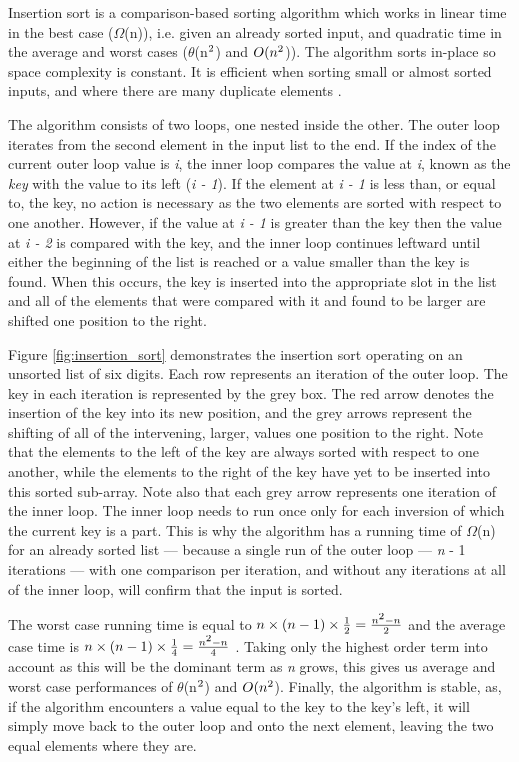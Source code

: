 \documentclass[12pt, a4paper]{article}
\begin{document}
Insertion sort is a comparison-based sorting algorithm which works in linear time in the best case ($\Omega$(n)), i.e. given an already sorted input, and quadratic time in the average and worst cases ($\theta$(n$\textsuperscript{2}$) and $O(n\textsuperscript{2}$)). The algorithm sorts in-place so space complexity is constant. It is efficient when sorting small or almost sorted inputs, and where there are many duplicate elements \autocite[p. 60]{heineman2016algorithms}.

The algorithm consists of two loops, one nested inside the other. The outer loop iterates from the second element in the input list to the end. If the index of the current outer loop value is \emph{i}, the inner loop compares the value at \emph{i}, known as the \emph{key} with the value to its left (\emph{i - 1}). If the element at \emph{i - 1} is less than, or equal to, the key, no action is necessary as the two elements are sorted with respect to one another. However, if the value at \emph{i - 1} is greater than the key then the value at \emph{i - 2} is compared with the key, and the inner loop continues leftward until either the beginning of the list is reached or a value smaller than the key is found. When this occurs, the key is inserted into the appropriate slot in the list and all of the elements that were compared with it and found to be larger are shifted one position to the right.

Figure \ref{fig:insertion_sort} demonstrates the insertion sort operating on an unsorted list of six digits. Each row represents an iteration of the outer loop. The key in each iteration is represented by the grey box. The red arrow denotes the insertion of the key into its new position, and the grey arrows represent the shifting of all of the intervening, larger, values one position to the right. Note that the elements to the left of the key are always sorted with respect to one another, while the elements to the right of the key have yet to be inserted into this sorted sub-array. Note also that each grey arrow represents one iteration of the inner loop. The inner loop needs to run once only for each inversion of which the current key is a part. This is why the algorithm has a running time of $\Omega$(n) for an already sorted list — because a single run of the outer loop — \emph{n} - 1 iterations — with one comparison per iteration, and without any iterations at all of the inner loop, will confirm that the input is sorted.

The worst case running time is equal to $n \times (n - 1) \times \frac{1}{2} = \frac{n\textsuperscript{2} - n}{2}$ and the average case time is  $n \times (n - 1) \times \frac{1}{4} = \frac{n\textsuperscript{2} - n}{4}$ \autocite{woltmann20:insertion}. Taking only the highest order term into account as this will be the dominant term as \emph{n} grows, this gives us average and worst case performances of $\theta$(n$\textsuperscript{2}$) and $O(n\textsuperscript{2}$). Finally, the algorithm is stable, as, if the algorithm encounters a value equal to the key to the key's left, it will simply move back to the outer loop and onto the next element, leaving the two equal elements where they are.
\end{document}
